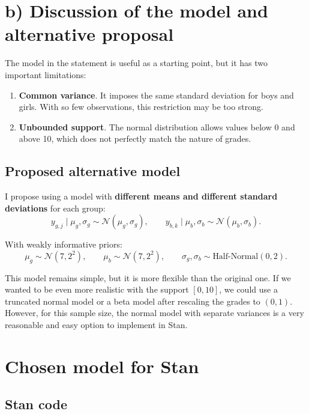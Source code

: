 \documentclass[
  12pt,
]{article}
\providecommand{\tightlist}{%
  \setlength{\itemsep}{0pt}\setlength{\parskip}{0pt}}
\begin{document}
\section{b) Discussion of the model and alternative
proposal}\label{b-discussion-of-the-model-and-alternative-proposal}

The model in the statement is useful as a starting point, but it has two
important limitations:

\begin{enumerate}
\def\labelenumi{\arabic{enumi}.}
\tightlist
\item
  \textbf{Common variance}. It imposes the same standard deviation for
  boys and girls. With so few observations, this restriction may be too
  strong.
\item
  \textbf{Unbounded support}. The normal distribution allows values
  below 0 and above 10, which does not perfectly match the nature of
  grades.
\end{enumerate}

\subsection{Proposed alternative
model}\label{proposed-alternative-model}

I propose using a model with \textbf{different means and different
standard deviations} for each group: \[
y_{g,j} \mid \mu_g, \sigma_g \sim \mathcal N(\mu_g, \sigma_g),
\qquad
y_{b,k} \mid \mu_b, \sigma_b \sim \mathcal N(\mu_b, \sigma_b).
\]

With weakly informative priors: \[
\mu_g \sim \mathcal N(7, 2^2), \qquad
\mu_b \sim \mathcal N(7, 2^2), \qquad
\sigma_g, \sigma_b \sim \text{Half-Normal}(0, 2).
\]

This model remains simple, but it is more flexible than the original
one. If we wanted to be even more realistic with the support \([0,10]\),
we could use a truncated normal model or a beta model after rescaling
the grades to \((0,1)\). However, for this sample size, the normal model
with separate variances is a very reasonable and easy option to
implement in Stan.

\section{Chosen model for Stan}\label{chosen-model-for-stan}

\subsection{Stan code}\label{stan-code}
\end{document}
